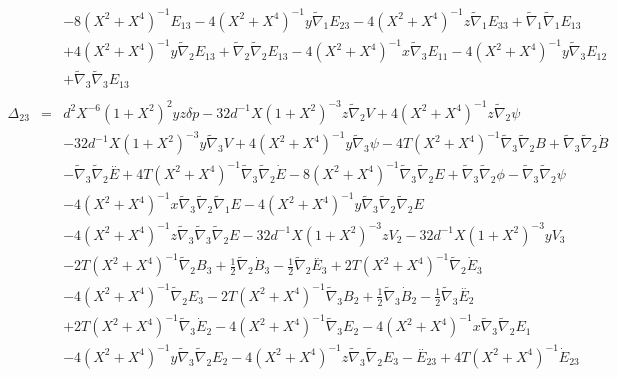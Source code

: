 \documentclass[10pt,letterpaper]{article}
\numberwithin{equation}{section}
\begin{document}
\begin{appendices}
\begin{eqnarray}
&& - 8 (X^2 + X^4)^{-1} E_{13} - 4 (X^2 + X^4)^{-1} y \tilde{\nabla}_{1}E_{23} - 4 (X^2 + X^4)^{-1} z \tilde{\nabla}_{1}E_{33} + \tilde{\nabla}_{1}\tilde{\nabla}_{1}E_{13} \nonumber \\ 
&& + 4 (X^2 + X^4)^{-1} y \tilde{\nabla}_{2}E_{13} + \tilde{\nabla}_{2}\tilde{\nabla}_{2}E_{13} - 4 (X^2 + X^4)^{-1} x \tilde{\nabla}_{3}E_{11} - 4 (X^2 + X^4)^{-1} y \tilde{\nabla}_{3}E_{12} \nonumber \\ 
&& + \tilde{\nabla}_{3}\tilde{\nabla}_{3}E_{13}
\\  \nonumber\\ 
\Delta_{23}&=& d^2 X^{-6} (1 + X^2)^2 y z \delta p - 32 d^{-1} X (1 + X^2)^{-3} z \tilde{\nabla}_{2}V + 4 (X^2 + X^4)^{-1} z \tilde{\nabla}_{2}\psi \nonumber \\ 
&& - 32 d^{-1} X (1 + X^2)^{-3} y \tilde{\nabla}_{3}V + 4 (X^2 + X^4)^{-1} y \tilde{\nabla}_{3}\psi - 4 T (X^2 + X^4)^{-1} \tilde{\nabla}_{3}\tilde{\nabla}_{2}B + \tilde{\nabla}_{3}\tilde{\nabla}_{2}\dot{B} \nonumber \\ 
&& -  \tilde{\nabla}_{3}\tilde{\nabla}_{2}\overset{..}{E} + 4 T (X^2 + X^4)^{-1} \tilde{\nabla}_{3}\tilde{\nabla}_{2}\dot{E} - 8 (X^2 + X^4)^{-1} \tilde{\nabla}_{3}\tilde{\nabla}_{2}E + \tilde{\nabla}_{3}\tilde{\nabla}_{2}\phi -  \tilde{\nabla}_{3}\tilde{\nabla}_{2}\psi \nonumber \\ 
&& - 4 (X^2 + X^4)^{-1} x \tilde{\nabla}_{3}\tilde{\nabla}_{2}\tilde{\nabla}_{1}E - 4 (X^2 + X^4)^{-1} y \tilde{\nabla}_{3}\tilde{\nabla}_{2}\tilde{\nabla}_{2}E \nonumber \\ 
&& - 4 (X^2 + X^4)^{-1} z \tilde{\nabla}_{3}\tilde{\nabla}_{3}\tilde{\nabla}_{2}E-32 d^{-1} X (1 + X^2)^{-3} z V_{2} - 32 d^{-1} X (1 + X^2)^{-3} y V_{3} \nonumber \\ 
&& - 2 T (X^2 + X^4)^{-1} \tilde{\nabla}_{2}B_{3} + \tfrac{1}{2} \tilde{\nabla}_{2}\dot{B}_{3} -  \tfrac{1}{2} \tilde{\nabla}_{2}\overset{..}{E}_{3} + 2 T (X^2 + X^4)^{-1} \tilde{\nabla}_{2}\dot{E}_{3} \nonumber \\ 
&& - 4 (X^2 + X^4)^{-1} \tilde{\nabla}_{2}E_{3} - 2 T (X^2 + X^4)^{-1} \tilde{\nabla}_{3}B_{2} + \tfrac{1}{2} \tilde{\nabla}_{3}\dot{B}_{2} -  \tfrac{1}{2} \tilde{\nabla}_{3}\overset{..}{E}_{2} \nonumber \\ 
&& + 2 T (X^2 + X^4)^{-1} \tilde{\nabla}_{3}\dot{E}_{2} - 4 (X^2 + X^4)^{-1} \tilde{\nabla}_{3}E_{2} - 4 (X^2 + X^4)^{-1} x \tilde{\nabla}_{3}\tilde{\nabla}_{2}E_{1} \nonumber \\ 
&& - 4 (X^2 + X^4)^{-1} y \tilde{\nabla}_{3}\tilde{\nabla}_{2}E_{2} - 4 (X^2 + X^4)^{-1} z \tilde{\nabla}_{3}\tilde{\nabla}_{2}E_{3}- \overset{..}{E}_{23} + 4 T (X^2 + X^4)^{-1} \dot{E}_{23} \nonumber \\ 

\end{eqnarray}
\end{appendices}
\end{document}
